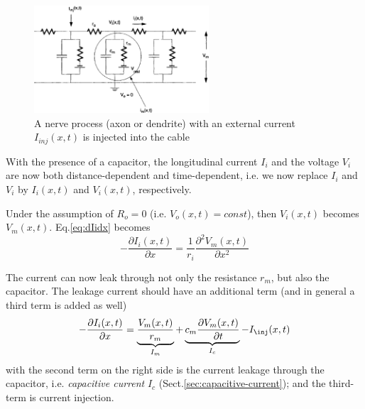 
\begin{figure}[htb]
\centerline{\includegraphics[height=4cm]{./images/membrane_RC-model.eps}}
\caption{A nerve process (axon or dendrite) with an
external current $I_{inj}(x,t)$ is injected into the cable}\label{fig:cylinder}
\end{figure} 

With the presence of a capacitor, the longitudinal current $I_i$ and the voltage
$V_i$ are now both distance-dependent and time-dependent, i.e.  we now replace
$I_i$ and $V_i$ by $I_i(x,t)$ and $V_i(x,t)$, respectively. 

Under the assumption of $R_o = 0$ (i.e. $V_o(x,t) = const$), then $V_i(x,t)$
becomes $V_m(x,t)$. Eq.\ref{eq:dIidx} becomes
\begin{equation}
  \label{eq:dIidx_capacitor}
  -\frac{\partial I_i(x,t)}{\partial x} =  \frac{1}{r_i}\frac{\partial
  ^2V_m(x,t)}{\partial x^2}
\end{equation} 

% 

The current can now leak through not only the
resistance $r_m$, but also the capacitor.  The leakage
current should have an additional term (and in general a third term is added as well)
\begin{equation}
\label{eq:dIidx_active}
-\frac{\partial I_i(x,t)}{\partial x} = \underbrace{\frac{V_m(x,t)}{r_m}}_{I_m}
+ \underbrace{c_m
\frac{\partial V_m(x,t)}{\partial t}}_{I_c} - I_\inj(x,t)
\end{equation}
with the second term on the right side is the current leakage through the
capacitor, i.e. {\it capacitive current}
$I_c$ (Sect.\ref{sec:capacitive-current}); and the third-term is current
injection.

